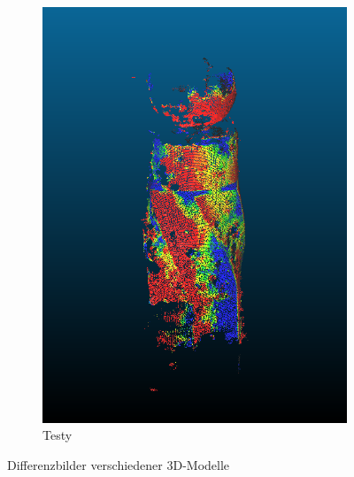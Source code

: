 \documentclass[./00PhotoBox.tex]{subfiles}
\begin{document}
\begin{figure}
\begin{subfigure}{0.27\textwidth}
        \includegraphics[width=1\textwidth]{img/testy_diff.png}
        \caption{Testy}
        \label{img:differenz_testy}
    \end{subfigure}
    \caption{Differenzbilder verschiedener 3D-Modelle}
    \label{img:differenz}
\end{figure}
\end{document}
